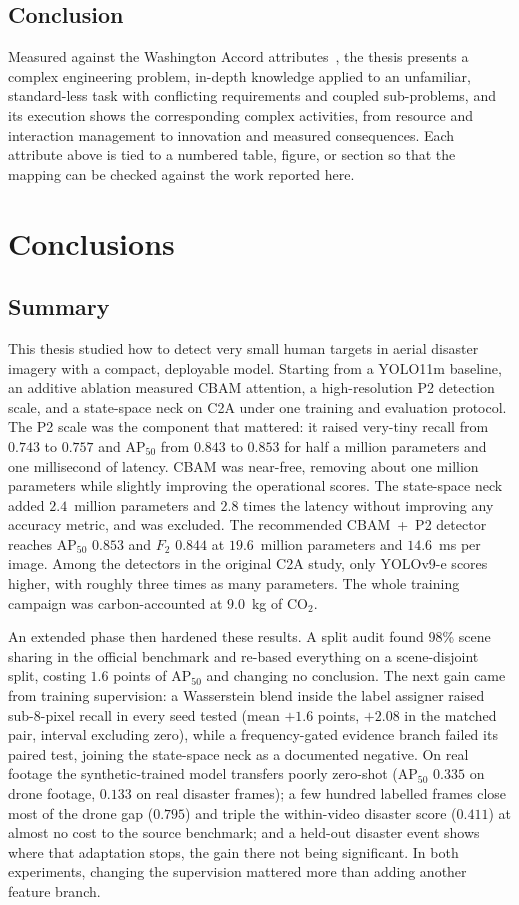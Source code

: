 \documentclass[12pt,a4paper,oneside]{report}
\begin{document}
\section{Conclusion}
Measured against the Washington Accord attributes~\cite{iea2021gapc}, the
thesis presents a complex engineering problem, in-depth knowledge applied to
an unfamiliar, standard-less task with conflicting requirements and coupled
sub-problems, and its execution shows the corresponding complex activities,
from resource and interaction management to innovation and measured
consequences. Each attribute above is tied to a numbered table, figure, or
section so that the mapping can be checked against the work reported here.
 \newpage 
 \newpage \chapter{Conclusions}

\section{Summary}
This thesis studied how to detect very small human targets in aerial disaster
imagery with a compact, deployable model. Starting from a YOLO11m
baseline, an additive ablation measured CBAM attention, a high-resolution P2
detection scale, and a state-space neck on C2A under one training and
evaluation protocol. The P2 scale was the component
that mattered: it raised very-tiny recall from $0.743$ to $0.757$ and
$\mathrm{AP}_{50}$ from $0.843$ to $0.853$ for half a million
parameters and one millisecond of latency. CBAM was near-free, removing about
one million parameters while slightly improving the operational scores. The
state-space neck added $2.4$~million parameters and $2.8$ times the latency
without improving any accuracy metric, and was excluded. The
recommended CBAM~+~P2 detector reaches $\mathrm{AP}_{50}$ $0.853$ and $F_2$
$0.844$ at $19.6$~million parameters and $14.6$~ms per image. Among the
detectors in the original C2A study, only YOLOv9-e scores higher, with
roughly three times as many parameters. The whole
training campaign was carbon-accounted at $9.0$~kg of CO$_2$.

An extended phase then hardened these results. A split audit found 98\% scene
sharing in the official benchmark and re-based everything on a scene-disjoint
split, costing $1.6$ points of $\mathrm{AP}_{50}$ and changing no conclusion.
The next gain came from training
supervision: a Wasserstein blend inside the label assigner raised sub-8-pixel
recall in every seed tested (mean $+1.6$ points, $+2.08$ in the matched pair,
interval excluding zero), while a frequency-gated evidence branch failed its
paired test, joining the state-space neck as a documented negative. On real
footage the synthetic-trained model transfers poorly
zero-shot ($\mathrm{AP}_{50}$ $0.335$ on drone footage, $0.133$ on real
disaster frames); a few hundred labelled frames close most of the drone gap
($0.795$) and triple the within-video disaster score ($0.411$) at almost no
cost to the source benchmark; and a held-out disaster event shows where that
adaptation stops, the gain there not being significant. In both experiments,
changing the supervision mattered more than adding another feature branch.
\end{document}
